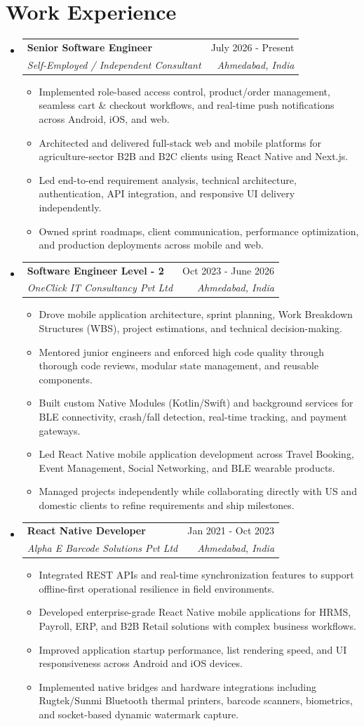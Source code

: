 \documentclass[letterpaper,10.5pt]{article}
\makeatletter
\newcommand{\resumeItem}[1]{
  \item\small{
    {#1 \vspace{-2pt}}
  }
}
\newcommand{\resumeSubheading}[4]{
  \vspace{-1pt}\item
    \begin{tabular*}{0.99\textwidth}[t]{l@{\extracolsep{\fill}}r}
      \textbf{#1} & \small #2 \\
      \textit{\small#3} & \textit{\small #4} \\
    \end{tabular*}\vspace{-6pt}
}
\newcommand{\resumeSubHeadingListStart}{\begin{itemize}[leftmargin=0.0in, label={}]}
\newcommand{\resumeSubHeadingListEnd}{\end{itemize}}
\newcommand{\resumeItemListStart}{\begin{itemize}[leftmargin=0.16in]}
\newcommand{\resumeItemListEnd}{\end{itemize}\vspace{-4pt}}
\makeatother
\begin{document}
\section{Work Experience}
\resumeSubHeadingListStart
\resumeSubheading
  {Senior Software Engineer}{July 2026 - Present}
  {Self-Employed / Independent Consultant}{Ahmedabad, India}
  \resumeItemListStart
    \resumeItem{Implemented role-based access control, product/order management, seamless cart \& checkout workflows, and real-time push notifications across Android, iOS, and web.}
    \resumeItem{Architected and delivered full-stack web and mobile platforms for agriculture-sector B2B and B2C clients using React Native and Next.js.}
    \resumeItem{Led end-to-end requirement analysis, technical architecture, authentication, API integration, and responsive UI delivery independently.}
    \resumeItem{Owned sprint roadmaps, client communication, performance optimization, and production deployments across mobile and web.}
  \resumeItemListEnd

\resumeSubheading
  {Software Engineer Level - 2}{Oct 2023 - June 2026}
  {OneClick IT Consultancy Pvt Ltd}{Ahmedabad, India}
  \resumeItemListStart
    \resumeItem{Drove mobile application architecture, sprint planning, Work Breakdown Structures (WBS), project estimations, and technical decision-making.}
    \resumeItem{Mentored junior engineers and enforced high code quality through thorough code reviews, modular state management, and reusable components.}
    \resumeItem{Built custom Native Modules (Kotlin/Swift) and background services for BLE connectivity, crash/fall detection, real-time tracking, and payment gateways.}
    \resumeItem{Led React Native mobile application development across Travel Booking, Event Management, Social Networking, and BLE wearable products.}
    \resumeItem{Managed projects independently while collaborating directly with US and domestic clients to refine requirements and ship milestones.}
  \resumeItemListEnd

\resumeSubheading
  {React Native Developer}{Jan 2021 - Oct 2023}
  {Alpha E Barcode Solutions Pvt Ltd}{Ahmedabad, India}
  \resumeItemListStart
    \resumeItem{Integrated REST APIs and real-time synchronization features to support offline-first operational resilience in field environments.}
    \resumeItem{Developed enterprise-grade React Native mobile applications for HRMS, Payroll, ERP, and B2B Retail solutions with complex business workflows.}
    \resumeItem{Improved application startup performance, list rendering speed, and UI responsiveness across Android and iOS devices.}
    \resumeItem{Implemented native bridges and hardware integrations including Rugtek/Sunmi Bluetooth thermal printers, barcode scanners, biometrics, and socket-based dynamic watermark capture.}
  \resumeItemListEnd
\resumeSubHeadingListEnd
\vspace{-6pt}
\end{document}
